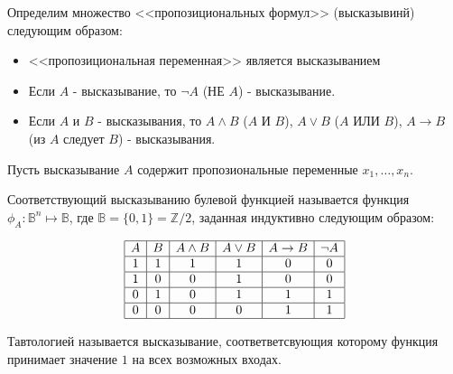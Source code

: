 \begin{definition} \thmslashn 

    Определим множество <<пропозициональных формул>> (высказывинй) следующим образом:

    \begin{itemize}
        \item <<пропозициональная переменная>> является высказыванием
        \item Если $A$ - высказывание, то $\neg A$ (НЕ $A$) - высказывание.
        \item Если $A$ и $B$ - высказывания, то $A \land B$ ($A$ И $B$), $A \lor B$ ($A$ ИЛИ $B$), $A \to B$ (из $A$ следует $B$) - высказывания.
    \end{itemize}
\end{definition}
\begin{definition} \thmslashn 

    Пусть высказывание $A$ содержит пропозиональные переменные $x_1, \ldots, x_{n}$.

    Соответствующий высказыванию булевой функцией называется функция $\phi_{A} : \mathbb{B}^{n} \mapsto \mathbb{B}$, где $\mathbb{B} = \{0, 1\} = \mathbb{Z}/2$, заданная индуктивно следующим образом:

    \begin{equation*}
        \begin{array}{|c|c|c|c|c|c|} \hline
            A & B & A \land B & A \lor B & A \to B & \neg A \\ \hline
            1 & 1 & 1 & 1 & 0 & 0\\ \hline
            1 & 0 & 0 & 1 & 0 & 0 \\ \hline
            0 & 1 & 0 & 1 & 1 & 1 \\ \hline
            0 & 0 & 0 & 0 & 1 & 1\\ \hline
        \end{array}
    \end{equation*}


\end{definition}

\begin{definition} \thmslashn 
    
    Тавтологией называется высказывание, соответветсвующия которому функция принимает значение $1$ на всех возможных входах. 

\end{definition}


